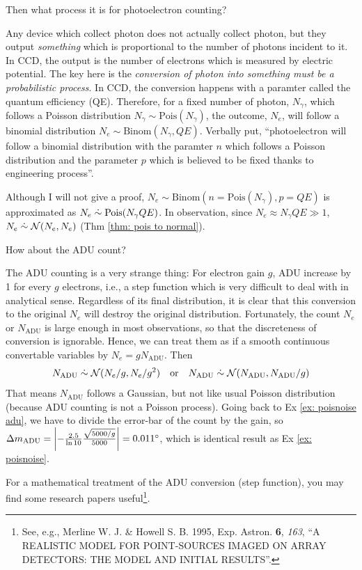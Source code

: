 Then what process it is for photoelectron counting?
\begin{ex}\label{ex: photoelectron binom}
Any device which collect photon does not actually collect photon, but they output \textit{something} which is proportional to the number of photons incident to it. In CCD, the output is the number of electrons which is measured by electric potential. The key here is the \emph{conversion of photon into \emph{something} must be a probabilistic process}. In CCD, the conversion happens with a paramter called the quantum efficiency (QE). Therefore, for a fixed number of photon, $ N_\gamma $, which follows a Poisson distribution $ N_\gamma \sim \mathrm{Pois}(N_\gamma) $, the outcome, $ N_e $, will follow a binomial distribution $ N_e \sim \mathrm{Binom}(N_\gamma, QE) $. Verbally put, ``photoelectron will follow a binomial distribution with the paramter $ n $ which follows a Poisson distribution and the parameter $ p $ which is believed to be fixed thanks to engineering process''.

Although I will not give a proof, $ N_e \sim \mathrm{Binom}(n=\mathrm{Pois}(N_\gamma), p=QE) $ is approximated as $ N_e \mathrel{\dot{\sim}} \mathrm{Pois}(N_\gamma QE) $. In observation, since $ N_e \approx N_\gamma QE \gg 1 $, $ N_e \mathrel{\dot{\sim}} \mathcal{N}(N_e, N_e) $ (Thm \ref{thm: pois to normal}).
\end{ex}

How about the ADU count?

\begin{ex}
The ADU counting is a very strange thing: For electron gain $ g $, ADU increase by 1 for every $ g $ electrons, i.e., a step function which is very difficult to deal with in analytical sense. Regardless of its final distribution, it is clear that this conversion to the original $ N_e $ will destroy the original distribution. Fortunately, the count $ N_e $ or $ N_\mathrm{ADU} $ is large enough in most observations, so that the discreteness of conversion is ignorable. Hence, we can treat them as if a smooth continuous convertable variables by $ N_e = g N_\mathrm{ADU} $. Then 
\begin{equation}\label{eq: adu distribution}
  N_\mathrm{ADU} \mathrel{\dot{\sim}} \mathcal{N}(N_e/g, N_e/g^2) \quad\mathrm{or}\quad
  N_\mathrm{ADU} \mathrel{\dot{\sim}} \mathcal{N}(N_\mathrm{ADU}, N_\mathrm{ADU}/g)
\end{equation}
That means $ N_\mathrm{ADU} $ follows a Gaussian, but not like usual Poisson distribution (because ADU counting is not a Poisson process). Going back to Ex \ref{ex: poisnoise adu}, we have to divide the error-bar of the count by the gain, so $ \Delta m_\mathrm{ADU} = \qty | -\frac{2.5}{\ln 10} \frac{\sqrt{5000/g}}{5000} | = \m{0.011} $, which is identical result as Ex \ref{ex: poisnoise}.
\end{ex}
For a mathematical treatment of the ADU conversion (step function), you may find some research papers useful\footnote{See, e.g., Merline W. J. \& Howell S. B. 1995, Exp. Astron. \textbf{6}, \textit{163}, ``A REALISTIC MODEL FOR POINT-SOURCES IMAGED ON ARRAY DETECTORS: THE MODEL AND INITIAL RESULTS''.}.


